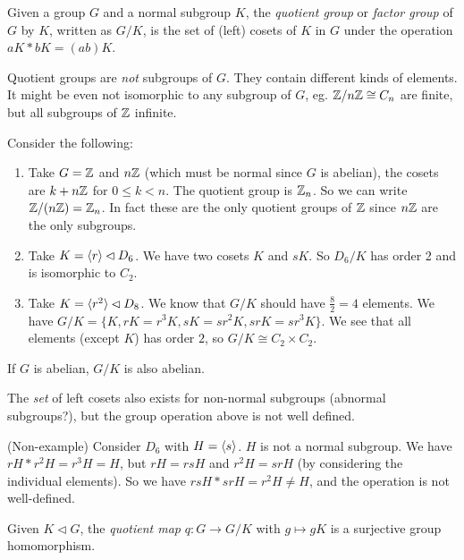 \documentclass[a4paper]{article}
\begin{document}
  \begin{defi}
    Given a group $G$ and a normal subgroup $K$, the \emph{quotient group} or \emph{factor group} of $G$ by $K$, written as $G/K$, is the set of (left) cosets of $K$ in $G$ under the operation $aK*bK = (ab)K$.
  \end{defi}

  \note Quotient groups are \emph{not} subgroups of $G$. They contain different kinds of elements. It might be even not isomorphic to any subgroup of $G$, eg. $\mathbb{Z}/n\mathbb{Z} \cong C_n$ are finite, but all subgroups of $\mathbb{Z}$ infinite.

  \begin{eg}
    Consider the following:
    \begin{enumerate}
      \item Take $G = \mathbb{Z}$ and $n\mathbb{Z}$ (which must be normal since $G$ is abelian), the cosets are $k + n\mathbb{Z}$ for $0 \leq k < n$. The quotient group is $\mathbb{Z}_n$. So we can write $\mathbb{Z}/(n\mathbb{Z}) = \mathbb{Z}_n$. In fact these are the only quotient groups of $\mathbb{Z}$ since $n\mathbb{Z}$ are the only subgroups.
      \item Take $K = \langle r\rangle \lhd D_6$. We have two cosets $K$ and $sK$. So $D_6/K$ has order 2 and is isomorphic to $C_2$.
      \item Take $K = \langle r^2\rangle \lhd D_8$. We know that $G/K$ should have $\frac{8}{2} = 4$ elements. We have $G/K = \{ K, rK = r^3 K, sK = sr^2K, srK = sr^3K\}$. We see that all elements (except $K$) has order $2$, so $G/K\cong C_2\times C_2$.
    \end{enumerate}
  \end{eg}
  \note If $G$ is abelian, $G/K$ is also abelian.

  \note The \emph{set} of left cosets also exists for non-normal subgroups (abnormal subgroups?), but the group operation above is not well defined.

  \begin{eg}
    (Non-example) Consider $D_6$ with $H = \langle s\rangle$. $H$ is not a normal subgroup. We have $rH * r^2 H = r^3 H = H$, but $rH = rsH$ and $r^2H = srH$ (by considering the individual elements). So we have $rsH * srH = r^2 H\not= H$, and the operation is not well-defined.
  \end{eg}

  \begin{lemma}
    Given $K\lhd G$, the \emph{quotient map} $q: G\rightarrow G/K$ with $g\mapsto gK$ is a surjective group homomorphism.
  \end{lemma}
\end{document}
